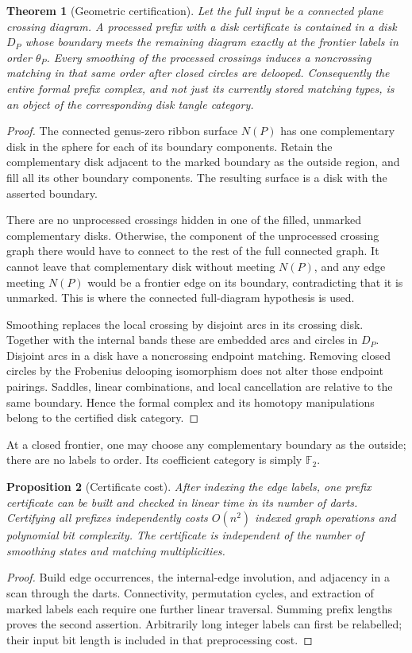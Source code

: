 \documentclass[11pt]{article}
\newtheorem{theorem}{Theorem}[section]
\newtheorem{proposition}[theorem]{Proposition}
\theoremstyle{definition}\newtheorem{definition}[theorem]{Definition}
\theoremstyle{remark}\newtheorem{remark}[theorem]{Remark}
\newcommand{\F}{{\mathbb F_2}}
\begin{document}
\begin{theorem}[Geometric certification]\label{thm:disk}
Let the full input be a connected plane crossing diagram. A processed prefix
with a disk certificate is contained in a disk $D_P$ whose boundary meets the
remaining diagram exactly at the frontier labels in order $\theta_P$.
Every smoothing of the processed crossings induces a noncrossing matching in
that same order after closed circles are delooped. Consequently the entire
formal prefix complex, and not just its currently stored matching types, is
an object of the corresponding disk tangle category.
\end{theorem}
\begin{proof}
The connected genus-zero ribbon surface $N(P)$ has one complementary disk in
the sphere for each of its boundary components. Retain the complementary disk
adjacent to the marked boundary as the outside region, and fill all its other
boundary components. The resulting surface is a disk with the asserted boundary.

There are no unprocessed crossings hidden in one of the filled, unmarked
complementary disks. Otherwise, the component of the unprocessed crossing graph
there would have to connect to the rest of the full connected graph. It cannot
leave that complementary disk without meeting $N(P)$, and any edge meeting
$N(P)$ would be a frontier edge on its boundary, contradicting that it is
unmarked. This is where the connected full-diagram hypothesis is used.

Smoothing replaces the local crossing by disjoint arcs in its crossing disk.
Together with the internal bands these are embedded arcs and circles in $D_P$.
Disjoint arcs in a disk have a noncrossing endpoint matching. Removing closed
circles by the Frobenius delooping isomorphism does not alter those endpoint
pairings. Saddles, linear combinations, and local cancellation are relative to
the same boundary. Hence the formal complex and its homotopy manipulations
belong to the certified disk category.
\end{proof}

At a closed frontier, one may choose any complementary boundary as the outside;
there are no labels to order. Its coefficient category is simply $\F$.

\begin{proposition}[Certificate cost]\label{prop:certcost}
After indexing the edge labels, one prefix certificate can be built and checked
in linear time in its number of darts. Certifying all prefixes independently
costs $O(n^2)$ indexed graph operations and polynomial bit complexity.
The certificate is independent of the number of smoothing states and matching
multiplicities.
\end{proposition}
\begin{proof}
Build edge occurrences, the internal-edge involution, and adjacency in a scan
through the darts. Connectivity, permutation cycles, and extraction of marked
labels each require one further linear traversal. Summing prefix lengths proves
the second assertion. Arbitrarily long integer labels can first be relabelled;
their input bit length is included in that preprocessing cost.
\end{proof}
\end{document}
